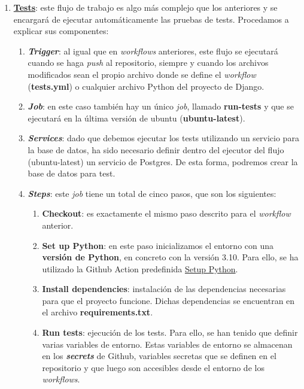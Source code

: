 \begin{enumerate}
        \item \textbf{\href{https://github.com/alexespana/TFG/actions/workflows/tests.yml}
        {Tests}}: este flujo de trabajo es algo más complejo que los anteriores y se encargará
        de ejecutar automáticamente las pruebas de tests. Procedamos a explicar sus componentes:
            \begin{enumerate}
                \item \textbf{\textit{Trigger}}: al igual que en \textit{workflows}
                anteriores, este flujo se ejecutará cuando se haga \textit{push} al
                repositorio, siempre y cuando los archivos modificados sean el propio
                archivo donde se define el \textit{workflow} (\textbf{tests.yml}) o
                cualquier archivo Python del proyecto de Django.
                \item \textbf{\textit{Job}}: en este caso también hay un único \textit{job},
                llamado \textbf{run-tests} y que se ejecutará en la última versión de
                ubuntu (\textbf{ubuntu-latest}).
                \item \textbf{\textit{Services}}: dado que debemos ejecutar los tests
                utilizando un servicio para la base de datos, ha sido necesario definir
                dentro del ejecutor del flujo (ubuntu-latest) un servicio de Postgres. De
                esta forma, podremos crear la base de datos para test.              
                \item \textbf{\textit{Steps}}: este \textit{job} tiene un total de cinco
                pasos, que son los siguientes:
                    \begin{enumerate}
                        \item \textbf{Checkout}: es exactamente el mismo paso descrito para
                        el \textit{workflow} anterior.
                        \item \textbf{Set up Python}: en este paso inicializamos el entorno
                        con una \textbf{versión de Python}, en concreto con la versión 3.10.
                        Para ello, se ha utilizado la Github Action predefinida
                        \href{https://github.com/marketplace/actions/setup-python}{Setup
                        Python}.
                        \item \textbf{Install dependencies}: instalación de las dependencias
                        necesarias para que el proyecto funcione. Dichas dependencias se
                        encuentran en el archivo \textbf{requirements.txt}.
                        \item \textbf{Run tests}: ejecución de los tests. Para ello, se han
                        tenido que definir varias variables de entorno. Estas variables de
                        entorno se almacenan en los \textbf{\textit{secrets}} de Github,
                        variables secretas que se definen en el repositorio y que luego son
                        accesibles desde el entorno de los \textit{workflows}.\\
                        

\end{enumerate}
\end{enumerate}
\end{enumerate}
